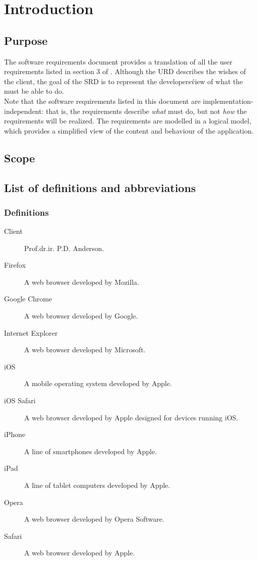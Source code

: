 \chapter{Introduction}

\section{Purpose}
The software requirements document provides a translation of all the user requirements listed in section 3 of . Although the URD describes the wishes of the client, the goal of the SRD is to represent the developers\' view of what the \applicationname must be able to do. \\
Note that the software requirements listed in this document are implementation-independent: that is, the requirements describe \emph{what} \projectname must do, but not \emph{how} the requirements will be realized. The requirements are modelled in a logical model, which provides a simplified view of the content and behaviour of the application.

\section{Scope}

\section{List of definitions and abbreviations}
\subsection{Definitions}

\begin{description}
\item[Client] Prof.dr.ir. P.D. Anderson.
\item[Firefox] A web browser developed by Mozilla.
\item[Google Chrome] A web browser developed by Google.
\item[Internet Explorer] A web browser developed by Microsoft.
\item[iOS] A mobile operating system developed by Apple.
\item[iOS Safari] A web browser developed by Apple designed for devices running iOS.
\item[iPhone] A line of smartphones developed by Apple.
\item[iPad] A line of tablet computers developed by Apple.
\item[Opera] A web browser developed by Opera Software.
\item[Safari] A web browser developed by Apple.
\end{description}


